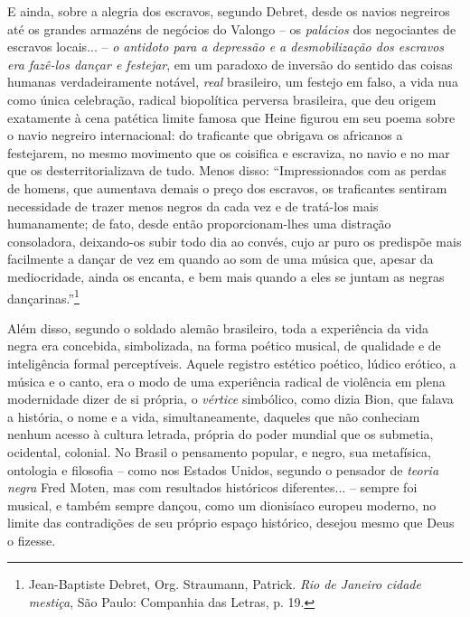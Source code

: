 E ainda, sobre a alegria dos escravos, segundo Debret, desde os navios
negreiros até os grandes armazéns de negócios do Valongo -- os
\emph{palácios} dos negociantes de escravos locais...­ -- \emph{o
antidoto para a depressão e a desmobilização dos escravos era fazê-los
dançar e festejar}, em um paradoxo de inversão do sentido das coisas
humanas verdadeiramente notável, \emph{real} brasileiro, um festejo em
falso, a vida nua como única celebração, radical biopolítica perversa
brasileira, que deu origem exatamente à cena patética limite famosa que
Heine figurou em seu poema sobre o navio negreiro internacional: do
traficante que obrigava os africanos a festejarem, no mesmo movimento
que os coisifica e escraviza, no navio e no mar que os
desterritorializava de tudo. Menos disso: ``Impressionados com as perdas
de homens, que aumentava demais o preço dos escravos, os traficantes
sentiram necessidade de trazer menos negros da cada vez e de tratá-los
mais humanamente; de fato, desde então proporcionam-lhes uma distração
consoladora, deixando-os subir todo dia ao convés, cujo ar puro os
predispõe mais facilmente a dançar de vez em quando ao som de uma música
que, apesar da mediocridade, ainda os encanta, e bem mais quando a eles
se juntam as negras dançarinas.''\footnote{Jean-Baptiste Debret, Org.
  Straumann, Patrick. \emph{Rio de Janeiro cidade mestiça}, São Paulo:
  Companhia das Letras, p. 19.}

Além disso, segundo o soldado alemão brasileiro, toda a experiência da
vida negra era concebida, simbolizada, na forma poético musical, de
qualidade e de inteligência formal perceptíveis. Aquele registro
estético poético, lúdico erótico, a música e o canto, era o modo de uma
experiência radical de violência em plena modernidade dizer de si
própria, o \emph{vértice} simbólico, como dizia Bion, que falava a
história, o nome e a vida, simultaneamente, daqueles que não conheciam
nenhum acesso à cultura letrada, própria do poder mundial que os
submetia, ocidental, colonial. No Brasil o pensamento popular, e negro,
sua metafísica, ontologia e filosofia -- como nos Estados Unidos,
segundo o pensador de \emph{teoria negra} Fred Moten, mas com resultados
históricos diferentes... -- sempre foi musical, e também sempre dançou,
como um dionisíaco europeu moderno, no limite das contradições de seu
próprio espaço histórico, desejou mesmo que Deus o fizesse.

